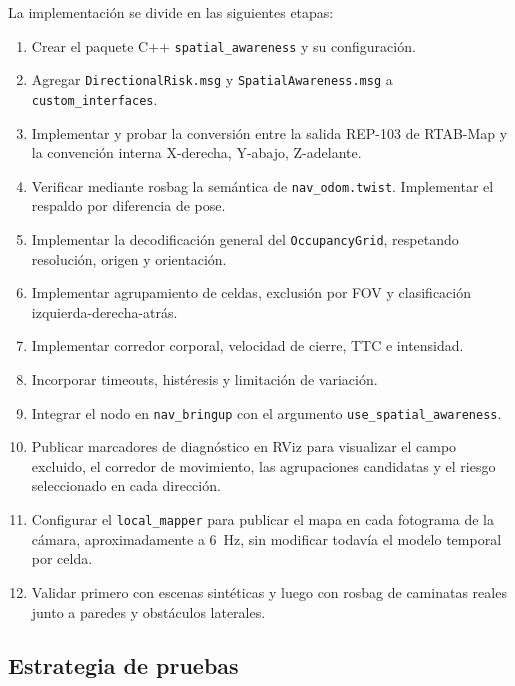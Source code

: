 La implementación se divide en las siguientes etapas:
%
\begin{enumerate}
  \item Crear el paquete C++ \texttt{spatial\_awareness} y su configuración.

  \item Agregar \texttt{DirectionalRisk.msg} y
    \texttt{SpatialAwareness.msg} a \texttt{custom\_interfaces}.

  \item Implementar y probar la conversión entre la salida REP-103 de RTAB-Map
    y la convención interna X-derecha, Y-abajo, Z-adelante.

  \item Verificar mediante rosbag la semántica de
    \texttt{nav\_odom.twist}. Implementar el respaldo por diferencia de pose.

  \item Implementar la decodificación general del
    \texttt{OccupancyGrid}, respetando resolución, origen y orientación.

  \item Implementar agrupamiento de celdas, exclusión por FOV y clasificación
    izquierda-derecha-atrás.

  \item Implementar corredor corporal, velocidad de cierre, TTC e intensidad.

  \item Incorporar timeouts, histéresis y limitación de variación.

  \item Integrar el nodo en \texttt{nav\_bringup} con el argumento
    \texttt{use\_spatial\_awareness}.

  \item Publicar marcadores de diagnóstico en RViz para visualizar el campo
    excluido, el corredor de movimiento, las agrupaciones candidatas y el
    riesgo seleccionado en cada dirección.

  \item Configurar el \texttt{local\_mapper} para publicar el mapa en cada
    fotograma de la cámara, aproximadamente a 6~Hz, sin modificar todavía el
    modelo temporal por celda.

  \item Validar primero con escenas sintéticas y luego con rosbag de caminatas
    reales junto a paredes y obstáculos laterales.
\end{enumerate}

\subsection{Estrategia de pruebas}
\label{subsec:sa-tests}

